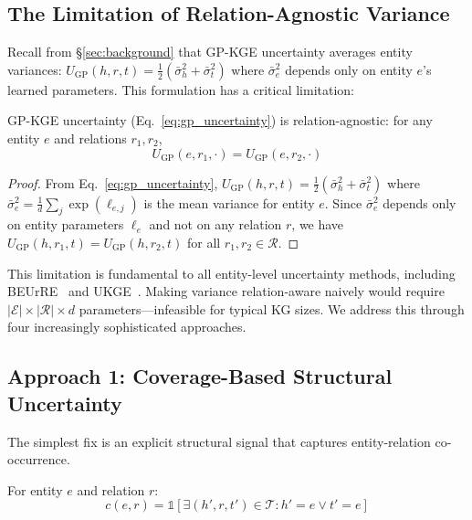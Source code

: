 
\subsection{The Limitation of Relation-Agnostic Variance}

Recall from \S\ref{sec:background} that GP-KGE uncertainty averages entity variances: $U_{\text{GP}}(h, r, t) = \frac{1}{2}(\bar{\sigma}^2_h + \bar{\sigma}^2_t)$ where $\bar{\sigma}^2_e$ depends only on entity $e$'s learned parameters.
This formulation has a critical limitation:

\begin{proposition}
\label{prop:relation_agnostic}
GP-KGE uncertainty (Eq.~\ref{eq:gp_uncertainty}) is relation-agnostic: for any entity $e$ and relations $r_1, r_2$,
\begin{equation}
    U_{\text{GP}}(e, r_1, \cdot) = U_{\text{GP}}(e, r_2, \cdot)
\end{equation}
\end{proposition}

\begin{proof}
From Eq.~\ref{eq:gp_uncertainty}, $U_{\text{GP}}(h, r, t) = \frac{1}{2}(\bar{\sigma}^2_h + \bar{\sigma}^2_t)$ where $\bar{\sigma}^2_e = \frac{1}{d}\sum_j \exp(\ell_{e,j})$ is the mean variance for entity $e$.
Since $\bar{\sigma}^2_e$ depends only on entity parameters $\ell_e$ and not on any relation $r$, we have $U_{\text{GP}}(h, r_1, t) = U_{\text{GP}}(h, r_2, t)$ for all $r_1, r_2 \in \mathcal{R}$.
\end{proof}

This limitation is fundamental to all entity-level uncertainty methods, including BEUrRE~\citep{chen2021probabilistic} and UKGE~\citep{chen2019embedding}.
Making variance relation-aware naively would require $|\mathcal{E}| \times |\mathcal{R}| \times d$ parameters---infeasible for typical KG sizes.
We address this through four increasingly sophisticated approaches.

\subsection{Approach 1: Coverage-Based Structural Uncertainty}

The simplest fix is an explicit structural signal that captures entity-relation co-occurrence.

\begin{definition}
For entity $e$ and relation $r$:
\begin{equation}
    c(e, r) = \mathbb{1}\left[\exists (h', r, t') \in \mathcal{T} : h' = e \lor t' = e\right]
\end{equation}
\end{definition}

